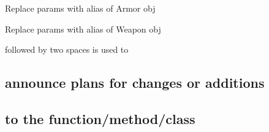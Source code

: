 
\begin{DoxyRefList}
\item[\label{todo__todo000002}%
\hypertarget{todo__todo000002}{}%
Member \hyperlink{classGladiator_1_1Gladiator_af45fc0044c3971a2364b99a8db3d4d52}{Gladiator.Gladiator.set\+Armor} (self, health\+Bonus, weight, name)]Replace params with alias of Armor obj  
\item[\label{todo__todo000001}%
\hypertarget{todo__todo000001}{}%
Member \hyperlink{classGladiator_1_1Gladiator_a06277c2f3b96691a9d87fa1006d42604}{Gladiator.Gladiator.set\+Weapon} (self, damage, weight, name)]Replace params with alias of Weapon obj  
\item[\label{todo__todo000003}%
\hypertarget{todo__todo000003}{}%
Page \hyperlink{md_README}{R\+E\+A\+D\+M\+E} ]followed by two spaces is used to \subsection*{announce plans for changes or additions}

\subsection*{to the function/method/class}


\end{DoxyRefList}